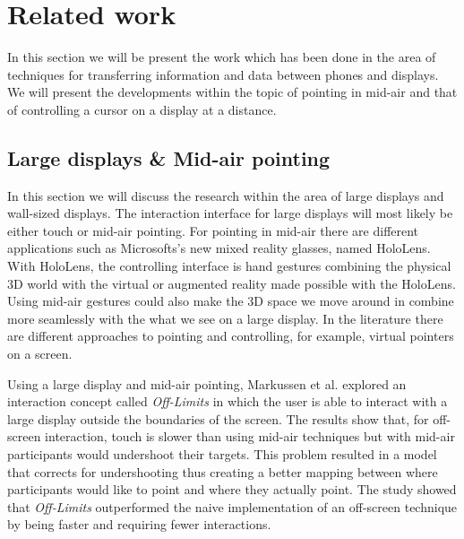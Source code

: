 \section{Related work} \label{sec:relatedwork}
In this section we will be present the work which has been done in the area of techniques for transferring information and data between phones and displays.
We will present the developments within the topic of pointing in mid-air and that of controlling a cursor on a display at a distance.

\subsection{Large displays \& Mid-air pointing} \label{sec:largeDisplayAirPointing}
In this section we will discuss the research within the area of large displays and wall-sized displays.
The interaction interface for large displays will most likely be either touch or mid-air pointing.
For pointing in mid-air there are different applications such as Microsofts's new mixed reality glasses, named HoloLens.
With HoloLens, the controlling interface is hand gestures combining the physical 3D world with the virtual or augmented reality made possible with the HoloLens.
Using mid-air gestures could also make the 3D space we move around in combine more seamlessly with the what we see on a large display.
In the literature there are different approaches to pointing and controlling, for example, virtual pointers on a screen. 

Using a large display and mid-air pointing, Markussen et al. \cite{Markussen:2016} explored an interaction concept called \emph{Off-Limits} in which the user is able to interact with a large display outside the boundaries of the screen.
The results show that, for off-screen interaction, touch is slower than using mid-air techniques but with mid-air participants would undershoot their targets.
This problem resulted in a model that corrects for undershooting thus creating a better mapping between where participants would like to point and where they actually point.
The study showed that \emph{Off-Limits} outperformed the naive implementation of an off-screen technique by being faster and requiring fewer interactions.


